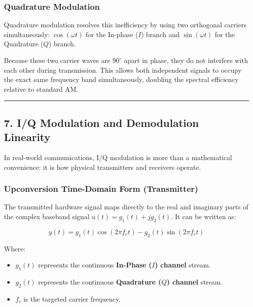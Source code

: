 \documentclass[
]{article}
\providecommand{\tightlist}{%
  \setlength{\itemsep}{0pt}\setlength{\parskip}{0pt}}
\begin{document}
\subsubsection{Quadrature Modulation}\label{quadrature-modulation}

Quadrature modulation resolves this inefficiency by using two orthogonal
carriers simultaneously: \(\cos(\omega t)\) for the In-phase (\(I\))
branch and \(\sin(\omega t)\) for the Quadrature (\(Q\)) branch.

Because these two carrier waves are \(90^\circ\) apart in phase, they do
not interfere with each other during transmission. This allows both
independent signals to occupy the exact same frequency band
simultaneously, doubling the spectral efficiency relative to standard
AM.

\begin{center}\rule{0.5\linewidth}{0.5pt}\end{center}

\subsection{7. I/Q Modulation and Demodulation
Linearity}\label{iq-modulation-and-demodulation-linearity}

In real-world communications, I/Q modulation is more than a mathematical
convenience: it is how physical transmitters and receivers operate.

\subsubsection{Upconversion Time-Domain Form
(Transmitter)}\label{upconversion-time-domain-form-transmitter}

The transmitted hardware signal maps directly to the real and imaginary
parts of the complex baseband signal \(u(t) = g_1(t) + j g_2(t)\). It
can be written as:

\[y(t) = g_1(t)\cos(2\pi f_c t) - g_2(t)\sin(2\pi f_c t)\]

Where:

\begin{itemize}
\tightlist
\item
  \(g_1(t)\) represents the continuous \textbf{In-Phase (\(I\)) channel}
  stream.
\item
  \(g_2(t)\) represents the continuous \textbf{Quadrature (\(Q\))
  channel} stream.
\item
  \(f_c\) is the targeted carrier frequency.
\end{itemize}
\end{document}
